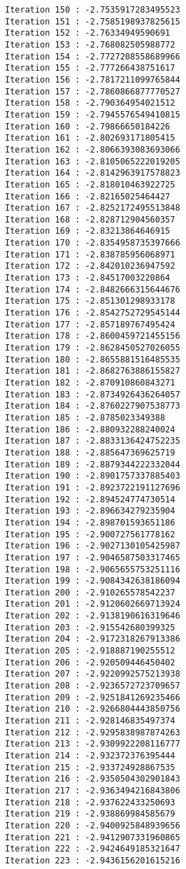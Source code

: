 \documentclass[11pt]{article}
\begin{document}
\begin{Verbatim}[commandchars=\\\{\}]
Iteration 150 : -2.7535917283495523
Iteration 151 : -2.7585198937825615
Iteration 152 : -2.76334949590691
Iteration 153 : -2.768082505988772
Iteration 154 : -2.7727208558689966
Iteration 155 : -2.777266438751617
Iteration 156 : -2.7817211099765844
Iteration 157 : -2.7860866877770527
Iteration 158 : -2.790364954021512
Iteration 159 : -2.7945576549410815
Iteration 160 : -2.79866650184226
Iteration 161 : -2.802693171805415
Iteration 162 : -2.8066393083693066
Iteration 163 : -2.8105065222019205
Iteration 164 : -2.8142963917578823
Iteration 165 : -2.818010463922725
Iteration 166 : -2.82165025464427
Iteration 167 : -2.8252172495513848
Iteration 168 : -2.828712904560357
Iteration 169 : -2.83213864646915
Iteration 170 : -2.8354958735397666
Iteration 171 : -2.838785956068971
Iteration 172 : -2.842010236947592
Iteration 173 : -2.84517003220864
Iteration 174 : -2.8482666315644676
Iteration 175 : -2.851301298933178
Iteration 176 : -2.8542752729545144
Iteration 177 : -2.857189767495424
Iteration 178 : -2.8600459721455156
Iteration 179 : -2.8628450527026055
Iteration 180 : -2.8655881516485535
Iteration 181 : -2.8682763886155827
Iteration 182 : -2.870910860843271
Iteration 183 : -2.8734926436264057
Iteration 184 : -2.8760227907538773
Iteration 185 : -2.8785023349388
Iteration 186 : -2.880932288240024
Iteration 187 : -2.8833136424752235
Iteration 188 : -2.885647369625719
Iteration 189 : -2.8879344222332044
Iteration 190 : -2.8901757337885403
Iteration 191 : -2.8923722191127696
Iteration 192 : -2.894524774730514
Iteration 193 : -2.896634279235904
Iteration 194 : -2.898701593651186
Iteration 195 : -2.900727561778162
Iteration 196 : -2.9027130105425987
Iteration 197 : -2.9046587503317465
Iteration 198 : -2.9065655753251116
Iteration 199 : -2.9084342638186094
Iteration 200 : -2.910265578542237
Iteration 201 : -2.9120602669713924
Iteration 202 : -2.9138190616319646
Iteration 203 : -2.915542680399325
Iteration 204 : -2.9172318267913386
Iteration 205 : -2.918887190255512
Iteration 206 : -2.920509446450402
Iteration 207 : -2.9220992575213938
Iteration 208 : -2.9236572723709657
Iteration 209 : -2.9251841269235466
Iteration 210 : -2.9266804443850756
Iteration 211 : -2.928146835497374
Iteration 212 : -2.9295838987874263
Iteration 213 : -2.9309922208116777
Iteration 214 : -2.932372376395444
Iteration 215 : -2.933724928867535
Iteration 216 : -2.9350504302901843
Iteration 217 : -2.9363494216843806
Iteration 218 : -2.937622433250693
Iteration 219 : -2.938869984585679
Iteration 220 : -2.9400925848939656
Iteration 221 : -2.9412907331960865
Iteration 222 : -2.9424649185321647
Iteration 223 : -2.9436156201615216

\end{Verbatim}
\end{document}
